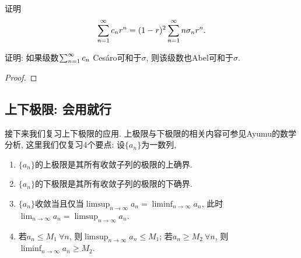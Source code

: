 \begin{example}
    证明
    $$ \sum_{n=1}^{\infty}c_n r^n = (1-r)^2 \sum_{n=1}^{\infty} n \sigma_n r^n. $$
\end{example}
\begin{exercise}
    证明: 如果级数$\sum_{n=1}^{\infty}c_n$ Ces\'aro可和于$\sigma$, 则该级数也Abel可和于$\sigma$.     
\end{exercise}
\begin{proof}

\end{proof}

\subsection{上下极限: 会用就行}
接下来我们复习上下极限的应用. 上极限与下极限的相关内容可参见Ayumu的数学分析, 这里我们仅复习4个要点: 设$\{a_n\}$为一数列,
\begin{enumerate}
    \item $\{a_n\}$的上极限是其所有收敛子列的极限的上确界.
    \item $\{a_n\}$的下极限是其所有收敛子列的极限的下确界.
    \item $\{a_n\}$收敛当且仅当$\limsup_{n\to \infty} a_n = \liminf_{n\to \infty} a_n$, 此时$\lim_{n \to \infty} a_n = \limsup_{n\to \infty} a_n$.
    \item 若$a_n \leq M_1~\forall n$, 则$\limsup_{n\to \infty} a_n \leq M_1$;
          若$a_n \geq M_2~\forall n$, 则$\liminf_{n\to \infty} a_n \geq M_2$.
\end{enumerate}

